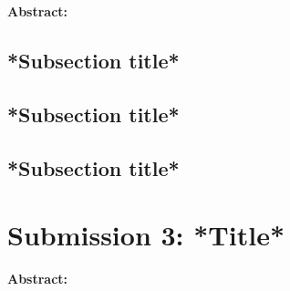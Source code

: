 \documentclass[a4paper, 10pt]{article}
\begin{document}
\textbf{Abstract: }




\begin{multicols*}{2}
\vspace{0.3cm}
\subsection{*Subsection title*}




\vspace{0.3cm}
\subsection{*Subsection title*}




\vspace{0.3cm}
\subsection{*Subsection title*}




\end{multicols*}



\newpage
\section{Submission 3: *Title* }

\textbf{Abstract: }
\end{document}
